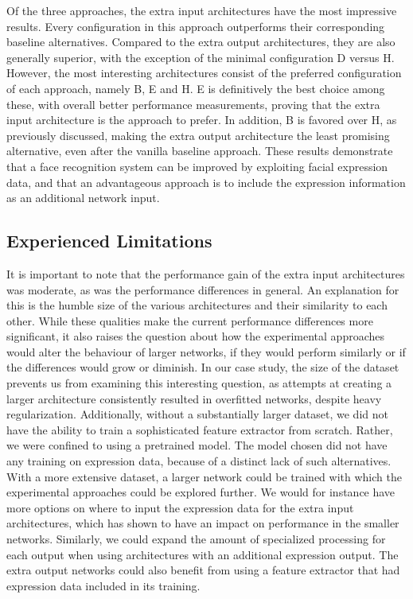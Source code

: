 \noindent Of the three approaches, the extra input architectures have the most impressive results. Every configuration in this approach outperforms their corresponding baseline alternatives. Compared to the extra output architectures, they are also generally superior, with the exception of the minimal configuration D versus H. However, the most interesting architectures consist of the preferred configuration of each approach, namely B, E and H. E is definitively the best choice among these, with overall better performance measurements, proving that the extra input architecture is the approach to prefer. In addition, B is favored over H, as previously discussed, making the extra output architecture the least promising alternative, even after the vanilla baseline approach. These results demonstrate that a face recognition system can be improved by exploiting facial expression data, and that an advantageous approach is to include the expression information as an additional network input.

\subsection{Experienced Limitations}

It is important to note that the performance gain of the extra input architectures was moderate, as was the performance differences in general. An explanation for this is the humble size of the various architectures and their similarity to each other. While these qualities make the current performance differences more significant, it also raises the question about how the experimental approaches would alter the behaviour of larger networks, if they would perform similarly or if the differences would grow or diminish. In our case study, the size of the dataset prevents us from examining this interesting question, as attempts at creating a larger architecture consistently resulted in overfitted networks, despite heavy regularization. Additionally, without a substantially larger dataset, we did not have the ability to train a sophisticated feature extractor from scratch. Rather, we were confined to using a pretrained model. The model chosen did not have any training on expression data, because of a distinct lack of such alternatives. \\

\noindent With a more extensive dataset, a larger network could be trained with which the experimental approaches could be explored further. We would for instance have more options on where to input the expression data for the extra input architectures, which has shown to have an impact on performance in the smaller networks. Similarly, we could expand the amount of specialized processing for each output when using architectures with an additional expression output. The extra output networks could also benefit from using a feature extractor that had expression data included in its training.


\cleardoublepage